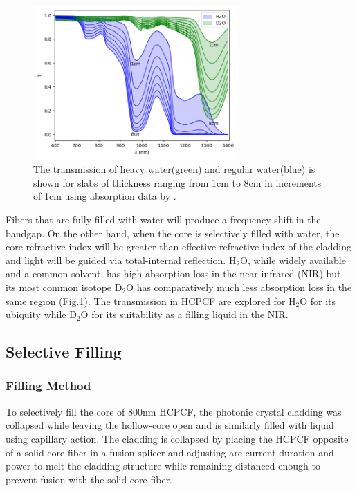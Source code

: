 \begin{figure}[!htb]
	\centering
	\includegraphics[width=0.7\textwidth]{./Figures/fiberfilling/water_transmission/water_transmission.png}
	\caption{The transmission of heavy water(green) and regular water(blue) is shown for slabs of thickness ranging from 1cm to 8cm in increments of 1cm using absorption data by \cite{kedenburg}. }
	\label{fig:water transmission}
\end{figure}
Fibers that are fully-filled with water will produce a frequency shift in the bandgap. On the other hand, when the core is selectively filled with water, the core refractive index will be greater than effective refractive index of the cladding and light will be guided via total-internal reflection. H${}_2$O, while widely available and a common solvent, has high absorption loss in the near infrared (NIR) but its most common isotope D${}_2$O has comparatively much less absorption loss in the same region (Fig.\ref{fig:water transmission}). The transmission in HCPCF are explored for H${}_2$O for its ubiquity while D${}_2$O for its suitability as a filling liquid in the NIR.
\clearpage
\subsection{Selective Filling}
\subsubsection{Filling Method}
To selectively fill the core of 800nm HCPCF, the photonic crystal cladding was collapsed while leaving the hollow-core open and is similarly filled with liquid using capillary action. The cladding is collapsed by placing the HCPCF opposite of a solid-core fiber in a fusion splicer \cite{xiao} and adjusting arc current duration and power to melt the cladding structure while remaining distanced enough to prevent fusion with the solid-core fiber.

